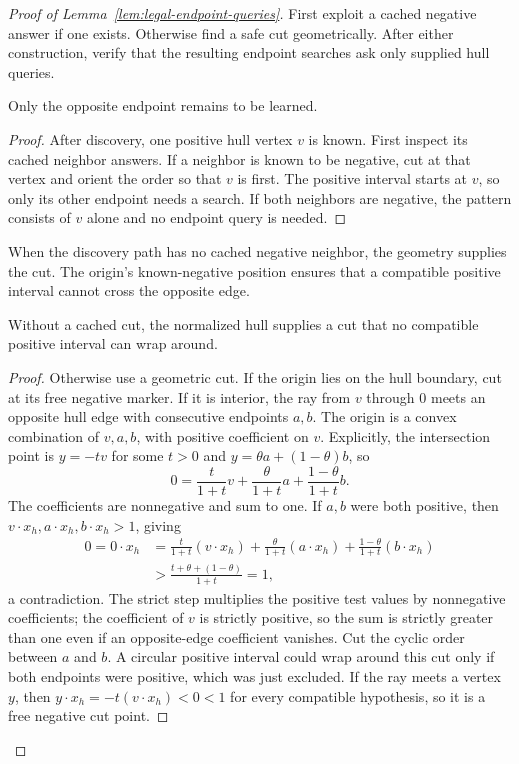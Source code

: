 \begin{proof}[Proof of Lemma~\ref{lem:legal-endpoint-queries}]
First exploit a cached negative answer if one exists. Otherwise find a
safe cut geometrically. After either construction, verify that the
resulting endpoint searches ask only supplied hull queries.

\begin{claim}
\label{clm:cached-endpoint}
Only the opposite endpoint remains to be learned.
\end{claim}
\begin{proof}
After discovery, one positive hull vertex $v$ is known.
First inspect its cached neighbor answers. If a neighbor is known
to be negative, cut at that vertex and orient the order so that
$v$ is first. The positive interval starts at $v$, so only its
other endpoint needs a search. If both neighbors are negative,
the pattern consists of $v$ alone and no endpoint query is needed.
\end{proof}

When the discovery path has no cached negative neighbor, the geometry
supplies the cut. The origin's known-negative position ensures that a
compatible positive interval cannot cross the opposite edge.

\begin{claim}
\label{clm:opposite-edge-cut}
Without a cached cut, the normalized hull supplies a cut that no
compatible positive interval can wrap around.
\end{claim}
\begin{proof}
Otherwise use a geometric cut. If the origin lies on the hull
boundary, cut at its free negative
marker. If it is interior, the ray from $v$ through $0$ meets
an opposite hull edge with consecutive endpoints $a,b$.
The origin is a convex combination of $v,a,b$, with positive
coefficient on $v$. Explicitly, the intersection point is
$y=-tv$ for some $t>0$ and $y=\theta a+(1-\theta)b$, so
\[
 0=\frac{t}{1+t}v+\frac{\theta}{1+t}a
                       +\frac{1-\theta}{1+t}b.
\]
The coefficients are nonnegative and sum to one. If $a,b$ were
both positive, then $v\cdot x_h,a\cdot x_h,b\cdot x_h>1$, giving
\[
 \begin{aligned}
 0=0\cdot x_h
 &=\frac{t}{1+t}(v\cdot x_h)
   +\frac{\theta}{1+t}(a\cdot x_h)
   +\frac{1-\theta}{1+t}(b\cdot x_h)\\
 &>\frac{t+\theta+(1-\theta)}{1+t}=1,
 \end{aligned}
\]
a contradiction. The strict step multiplies the positive test
values by nonnegative coefficients; the coefficient of $v$ is
strictly positive, so the sum is strictly greater than one even
if an opposite-edge coefficient vanishes.
Cut the cyclic order between $a$ and $b$. A circular positive
interval could wrap around this cut only if both endpoints
were positive, which was just excluded. If the ray meets a
vertex $y$, then $y\cdot x_h=-t(v\cdot x_h)<0<1$ for every
compatible hypothesis, so it is a free negative cut point.
\end{proof}


\end{proof}
